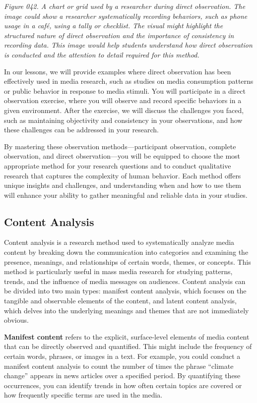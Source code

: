 \documentclass[
]{book}
\begin{document}
\emph{Figure 042. A chart or grid used by a researcher during direct observation. The image could show a researcher systematically recording behaviors, such as phone usage in a café, using a tally or checklist. The visual might highlight the structured nature of direct observation and the importance of consistency in recording data. This image would help students understand how direct observation is conducted and the attention to detail required for this method.}

In our lessons, we will provide examples where direct observation has been effectively used in media research, such as studies on media consumption patterns or public behavior in response to media stimuli. You will participate in a direct observation exercise, where you will observe and record specific behaviors in a given environment. After the exercise, we will discuss the challenges you faced, such as maintaining objectivity and consistency in your observations, and how these challenges can be addressed in your research.

By mastering these observation methods---participant observation, complete observation, and direct observation---you will be equipped to choose the most appropriate method for your research questions and to conduct qualitative research that captures the complexity of human behavior. Each method offers unique insights and challenges, and understanding when and how to use them will enhance your ability to gather meaningful and reliable data in your studies.

\subsection{Content Analysis}\label{content-analysis}

Content analysis is a research method used to systematically analyze media content by breaking down the communication into categories and examining the presence, meanings, and relationships of certain words, themes, or concepts. This method is particularly useful in mass media research for studying patterns, trends, and the influence of media messages on audiences. Content analysis can be divided into two main types: manifest content analysis, which focuses on the tangible and observable elements of the content, and latent content analysis, which delves into the underlying meanings and themes that are not immediately obvious.

\textbf{Manifest content} refers to the explicit, surface-level elements of media content that can be directly observed and quantified. This might include the frequency of certain words, phrases, or images in a text. For example, you could conduct a manifest content analysis to count the number of times the phrase ``climate change'' appears in news articles over a specified period. By quantifying these occurrences, you can identify trends in how often certain topics are covered or how frequently specific terms are used in the media.
\end{document}
